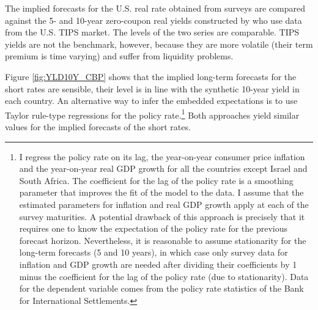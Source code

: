 {The implied forecasts for the U.S. real rate obtained from surveys are compared against the 5- and 10-year zero-coupon real yields constructed by \cite{GSW:2010} who use data from the U.S. TIPS market.
The levels of the two series are comparable. 
TIPS yields are not the benchmark, however, because they are more volatile (their term premium is time varying) and suffer from liquidity problems.

Figure \ref{fig:YLD10Y_CBP} shows that the implied long-term forecasts for the short rates are sensible, their level is in line with the synthetic 10-year yield in each country.
An alternative way to infer the embedded expectations is to use Taylor rule-type regressions for the policy rate.\footnote{ I regress the policy rate on its lag, the year-on-year consumer price inflation and the year-on-year real GDP growth for all the countries except Israel and South Africa. The coefficient for the lag of the policy rate is a smoothing parameter that improves the fit of the model to the data. I assume that the estimated parameters for inflation and real GDP growth apply at each of the survey maturities. A potential drawback of this approach is precisely that it requires one to know the expectation of the policy rate for the previous forecast horizon. Nevertheless, it is reasonable to assume stationarity for the long-term forecasts (5 and 10 years), in which case only survey data for inflation and GDP growth are needed after dividing their coefficients by 1 minus the coefficient for the lag of the policy rate (due to stationarity). Data for the dependent variable comes from the policy rate statistics of the Bank for International Settlements.}
Both approaches yield similar values for the implied forecasts of the short rates. %




}
